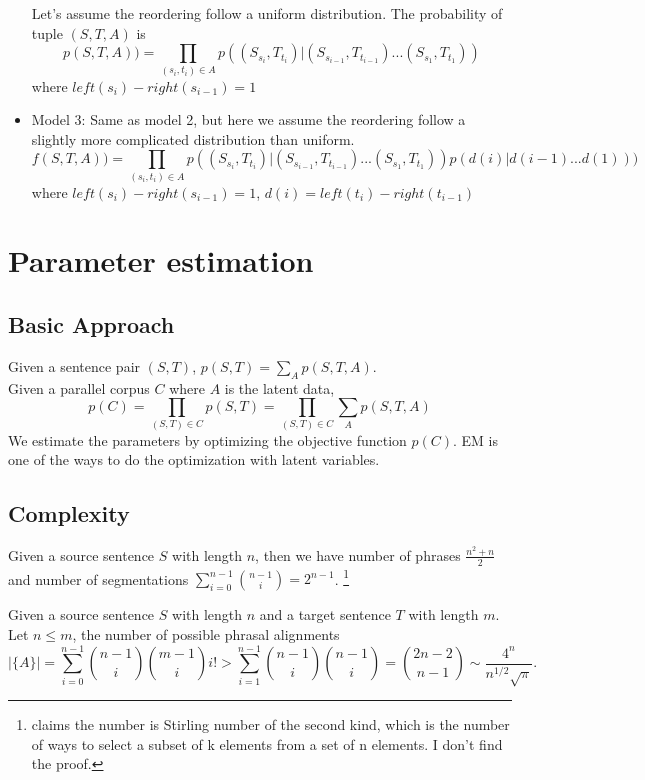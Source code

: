 \documentclass[11pt, letterpaper]{article}   	%
\begin{document}
\begin{itemize}
Let's assume the reordering follow a uniform distribution.
The probability of tuple $(S,T,A)$ is 
\begin{equation} \label{eq:obj2}
p(S,T,A))=\prod_{(s_i,t_i) \in A} p((S_{s_i},T_{t_i})| (S_{s_{i-1}},T_{t_{i-1}}) ... (S_{s_{1}},T_{t_{1}}))
\end{equation}
where $left(s_i)- right(s_{i-1})=1$

\item Model 3:
Same as model 2, but here we assume the reordering follow a slightly more complicated distribution than uniform.
\begin{equation} \label{eq:obj3}
f(S,T,A))=\prod_{(s_i,t_i) \in A} p((S_{s_i},T_{t_i})| (S_{s_{i-1}},T_{t_{i-1}}) ... (S_{s_{1}},T_{t_{1}})) p(d(i) | d(i-1) ... d(1)) )
\end{equation}
where $left(s_i)- right(s_{i-1})=1$, \quad $d(i)=left(t_i)- right(t_{i-1})$
\end{itemize}

\section{Parameter estimation}
\subsection{Basic Approach}
Given a sentence pair $(S,T)$, $p(S,T)=\sum_{A}p(S,T,A)$.\\
Given a parallel corpus $C$ where $A$ is the latent data, 
\begin{equation}p(C)=\prod_{(S,T) \in C} p(S,T)=\prod_{(S,T) \in C} \sum_{A} p(S,T,A) \end{equation}
We estimate the parameters by optimizing the objective function $p(C)$. EM is one of the ways to do the optimization with latent variables.

\subsection{Complexity}
Given a source sentence $S$ with length $n$, then we have number of phrases $\frac{n^2+n}{2}$ and number of segmentations $\sum\limits_{i=0}^{n-1} {n-1 \choose i} = 2^{n-1}$. \footnote{\cite{marcu-wong-02} claims the number is Stirling number of the second kind, which is the number of ways to select a subset of k elements from a set of n elements. I don't find the proof.}

Given a source sentence $S$ with length $n$ and a target sentence $T$ with length $m$.  Let $n \leqslant m $, the number of possible phrasal alignments 
\begin{equation}
|\{A\}|= \sum \limits_{i=0}^{n-1} {n-1 \choose i}{m-1 \choose i}i!  > \sum \limits_{i=1}^{n-1} {n-1 \choose i}{n-1 \choose i} = {2n-2 \choose n-1} \sim \frac{4^n}{n^{1/2} \sqrt{\pi}}.
\end{equation}
\end{document}
